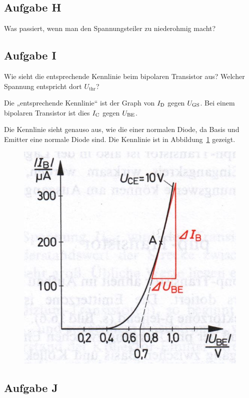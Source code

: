 \FloatBarrier
\subsection{Aufgabe H}

\begin{problem}
	Was passiert, wenn man den Spannungsteiler zu niederohmig macht?
\end{problem}

\fehlt

\FloatBarrier
\subsection{Aufgabe I}

\begin{problem}
	Wie sieht die entsprechende Kennlinie beim bipolaren Transistor aus?
	Welcher Spannung entspricht dort $U_\text{thr}$?
\end{problem}

Die „entsprechende Kennlinie“ ist der Graph von $I_\text{D}$ gegen $U_\text{GS}$. Bei einem
bipolaren Transistor ist dies $I_\text{C}$ gegen $U_\text{BE}$.

Die Kennlinie sieht genauso aus, wie die einer normalen Diode, da Basis und
Emitter eine normale Diode sind. Die Kennlinie ist in
Abbildung~\ref{fig:beuth-bild-16-9} gezeigt.

\begin{figure}[htbp]
	\centering
	\includegraphics[width=.5\textwidth]{beuth-bild-16-9.jpg}
	\caption{%
		\cite[Bild~16.9]{beuth/elementare_elektronik}
	}
	\label{fig:beuth-bild-16-9}
\end{figure}

\FloatBarrier
\subsection{Aufgabe J}

